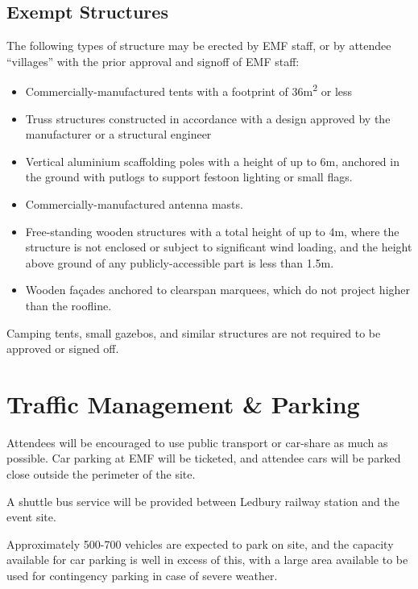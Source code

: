 \subsection{Exempt Structures}

The following types of structure may be erected by EMF staff, or by attendee ``villages''
with the prior approval and signoff of EMF staff:

\begin{itemize}
    \tightlist
    \item Commercially-manufactured tents with a footprint of 36m\textsuperscript{2} or less
    \item Truss structures constructed in accordance with a design approved by the manufacturer
          or a structural engineer
    \item Vertical aluminium scaffolding poles with a height of up to 6m, anchored in the
          ground with putlogs to support festoon lighting or small flags.
    \item Commercially-manufactured antenna masts.
    \item Free-standing wooden structures with a total height of up to 4m, where the
          structure is not enclosed or subject to significant wind loading, and the height above
          ground of any publicly-accessible part is less than 1.5m.
    \item Wooden façades anchored to clearspan marquees, which do not project higher than the roofline.
\end{itemize}

Camping tents, small gazebos, and similar structures are not required to be approved or signed off.

\section{Traffic Management \& Parking}

Attendees will be encouraged to use public transport or car-share as much as
possible. Car parking at EMF will be ticketed, and attendee cars will be
parked close outside the perimeter of the site.

A shuttle bus service will be provided between Ledbury railway station and the event
site.

Approximately 500-700 vehicles are expected to park on site, and the capacity
available for car parking is well in excess of this, with a large area available
to be used for contingency parking in case of severe weather.

